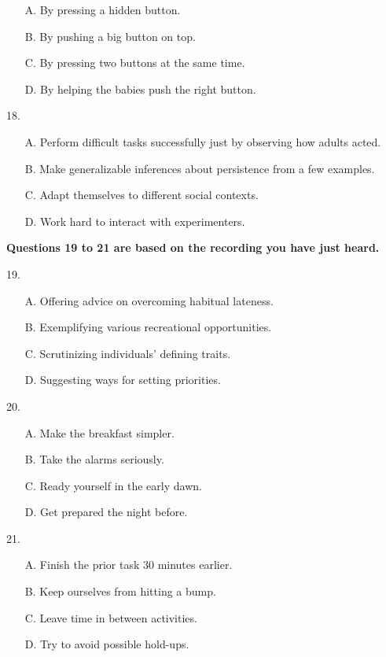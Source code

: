 \documentclass[UTF8,11pt]{ctexart}
\begin{document}
\begin{itemize}[leftmargin=2em,itemsep=.2em,topsep=.4em]\item[A.] By pressing a hidden button.
\item[B.] By pushing a big button on top.
\item[C.] By pressing two buttons at the same time.
\item[D.] By helping the babies push the right button.
\end{itemize}

18.


\begin{itemize}[leftmargin=2em,itemsep=.2em,topsep=.4em]\item[A.] Perform difficult tasks successfully just by observing how adults acted.
\item[B.] Make generalizable inferences about persistence from a few examples.
\item[C.] Adapt themselves to different social contexts.
\item[D.] Work hard to interact with experimenters.
\end{itemize}

\textbf{Questions 19 to 21 are based on the recording you have just heard.}


19.


\begin{itemize}[leftmargin=2em,itemsep=.2em,topsep=.4em]\item[A.] Offering advice on overcoming habitual lateness.
\item[B.] Exemplifying various recreational opportunities.
\item[C.] Scrutinizing individuals’ defining traits.
\item[D.] Suggesting ways for setting priorities.
\end{itemize}

20.


\begin{itemize}[leftmargin=2em,itemsep=.2em,topsep=.4em]\item[A.] Make the breakfast simpler.
\item[B.] Take the alarms seriously.
\item[C.] Ready yourself in the early dawn.
\item[D.] Get prepared the night before.
\end{itemize}

21.


\begin{itemize}[leftmargin=2em,itemsep=.2em,topsep=.4em]\item[A.] Finish the prior task 30 minutes earlier.
\item[B.] Keep ourselves from hitting a bump.
\item[C.] Leave time in between activities.
\item[D.] Try to avoid possible hold-ups.
\end{itemize}
\end{document}
